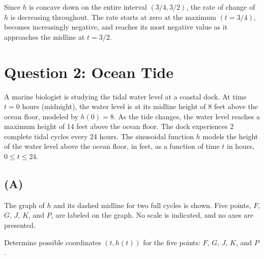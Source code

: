 \documentclass[11pt]{article}
\begin{document}
Since $h$ is concave down on the entire interval $(3/4, 3/2)$, the rate of change of $h$ is decreasing throughout. The rate starts at zero at the maximum $(t = 3/4)$, becomes increasingly negative, and reaches its most negative value as it approaches the midline at $t = 3/2$.

\newpage

\section*{Question 2: Ocean Tide}

A marine biologist is studying the tidal water level at a coastal dock. At time $t = 0$ hours (midnight), the water level is at its midline height of 8 feet above the ocean floor, modeled by $h(0) = 8$. As the tide changes, the water level reaches a maximum height of 14 feet above the ocean floor. The dock experiences 2 complete tidal cycles every 24 hours. The sinusoidal function $h$ models the height of the water level above the ocean floor, in feet, as a function of time $t$ in hours, $0 \leq t \leq 24$.

\subsection*{(A)}
The graph of $h$ and its dashed midline for two full cycles is shown. Five points, $F$, $G$, $J$, $K$, and $P$, are labeled on the graph. No scale is indicated, and no axes are presented.

Determine possible coordinates $(t, h(t))$ for the five points: $F$, $G$, $J$, $K$, and $P$.

\begin{center}
\end{center}
\end{document}
